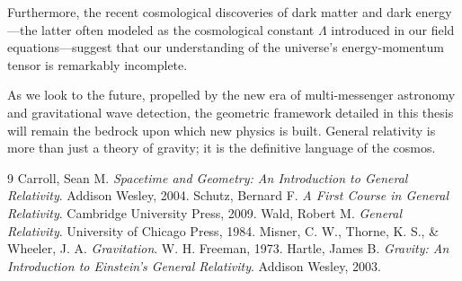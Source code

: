 \documentclass[11pt, a4paper]{report}
\begin{document}
Furthermore, the recent cosmological discoveries of dark matter and dark energy—the latter often modeled as the cosmological constant $\Lambda$ introduced in our field equations—suggest that our understanding of the universe's energy-momentum tensor is remarkably incomplete. 
\newline

As we look to the future, propelled by the new era of multi-messenger astronomy and gravitational wave detection, the geometric framework detailed in this thesis will remain the bedrock upon which new physics is built. General relativity is more than just a theory of gravity; it is the definitive language of the cosmos.



\begin{thebibliography}{9}
Carroll, Sean M. \textit{Spacetime and Geometry: An Introduction to General Relativity}. Addison Wesley, 2004.
Schutz, Bernard F. \textit{A First Course in General Relativity}. Cambridge University Press, 2009.
Wald, Robert M. \textit{General Relativity}. University of Chicago Press, 1984.
Misner, C. W., Thorne, K. S., \& Wheeler, J. A. \textit{Gravitation}. W. H. Freeman, 1973.
Hartle, James B. \textit{Gravity: An Introduction to Einstein's General Relativity}. Addison Wesley, 2003.
\end{thebibliography}
\end{document}
